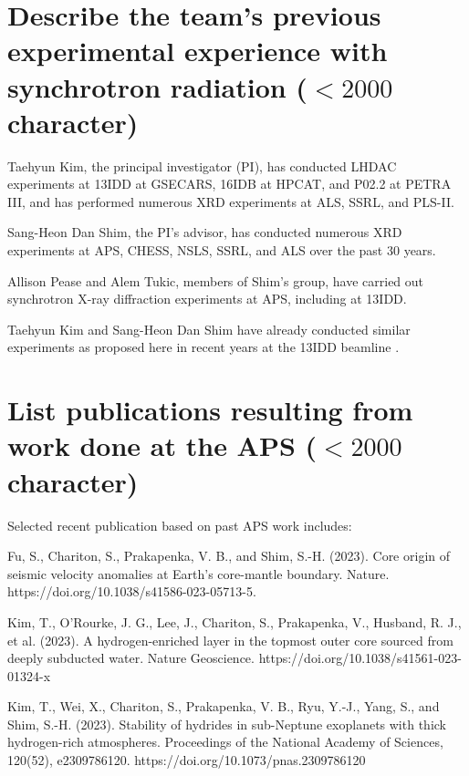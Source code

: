 \section{Describe the team's previous experimental experience with synchrotron radiation ($<2000$ character)}

Taehyun Kim, the principal investigator (PI), has conducted LHDAC experiments at 13IDD at GSECARS, 16IDB at HPCAT, and P02.2 at PETRA III, and has performed numerous XRD experiments at ALS, SSRL, and PLS-II.

Sang-Heon Dan Shim, the PI's advisor, has conducted numerous XRD experiments at APS, CHESS, NSLS, SSRL, and ALS over the past 30 years.

Allison Pease and Alem Tukic, members of Shim's group, have carried out synchrotron X-ray diffraction experiments at APS, including at 13IDD.

Taehyun Kim and Sang-Heon Dan Shim have already conducted similar experiments as proposed here in recent years at the 13IDD beamline \cite{kim_Stability_2023, horn_Building_2025}.



\section{List publications resulting from work done at the APS  ($<2000$ character)}


Selected recent publication based on past APS work includes:

Fu, S., Chariton, S., Prakapenka, V. B., and Shim, S.-H. (2023). Core origin of seismic velocity anomalies at Earth's core-mantle boundary. Nature. https://doi.org/10.1038/s41586-023-05713-5. 

Kim, T., O'Rourke, J. G., Lee, J., Chariton, S., Prakapenka, V., Husband, R. J., et al. (2023). A hydrogen-enriched layer in the topmost outer core sourced from deeply subducted water. Nature Geoscience. https://doi.org/10.1038/s41561-023-01324-x

Kim, T., Wei, X., Chariton, S., Prakapenka, V. B., Ryu, Y.-J., Yang, S., and Shim, S.-H. (2023). Stability of hydrides in sub-Neptune exoplanets with thick hydrogen-rich atmospheres. Proceedings of the National Academy of Sciences, 120(52), e2309786120. https://doi.org/10.1073/pnas.2309786120

